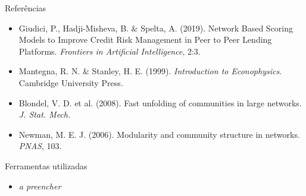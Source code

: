 \begin{frame}{Referências}
  \small
  \begin{itemize}
    \item Giudici, P., Hadji-Misheva, B. \& Spelta, A. (2019). Network Based Scoring Models to Improve Credit Risk
      Management in Peer to Peer Lending Platforms. \textit{Frontiers in Artificial Intelligence}, 2:3.
    \item Mantegna, R. N. \& Stanley, H. E. (1999). \textit{Introduction to Econophysics}. Cambridge University Press.
    \item Blondel, V. D. et al. (2008). Fast unfolding of communities in large networks. \textit{J. Stat. Mech.}
    \item Newman, M. E. J. (2006). Modularity and community structure in networks. \textit{PNAS}, 103.
  \end{itemize}
\end{frame}

\begin{frame}{Ferramentas utilizadas}
  \begin{itemize}
    \item \textit{a preencher}
  \end{itemize}
\end{frame}
